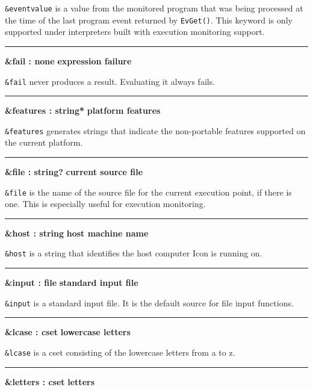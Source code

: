 \noindent
{}\texttt{\&eventvalue} is a value
from the monitored program that was being processed at the time of the
last program event returned by \texttt{EvGet()}. This keyword is only
supported under interpreters built with execution monitoring support.

\bigskip\hrule\vspace{0.1cm}
\noindent
{\bf \&fail : none } \hfill {\bf expression failure}

\noindent
{}\texttt{\&fail} never produces a
result. Evaluating it always fails.

\bigskip\hrule\vspace{0.1cm}
\noindent
{\bf \&features : string* } \hfill {\bf platform features}

\noindent
{}\texttt{\&features} generates strings that indicate the
non-portable features supported on the current platform.

\bigskip\hrule\vspace{0.1cm}
\noindent
{\bf \&file : string? } \hfill {\bf current source file}

\noindent
\texttt{\&file} is the name of the source file for
the current execution point, if there is one. This is especially useful
for execution monitoring.

\bigskip\hrule\vspace{0.1cm}
\noindent
{\bf \&host : string } \hfill {\bf host machine name}

\noindent
{}\texttt{\&host} is a string that
identifies the host computer Icon is running on.

\bigskip\hrule\vspace{0.1cm}
\noindent
{\bf \&input : file } \hfill {\bf standard input file}

\noindent
{}\texttt{\&input} is a standard input
file. It is the default source for file input functions.

\bigskip\hrule\vspace{0.1cm}
\noindent
{\bf \&lcase : cset } \hfill {\bf lowercase letters}

\noindent
{}\texttt{\&lcase} is a cset consisting of
the lowercase letters from a to z.

\bigskip\hrule\vspace{0.1cm}
\noindent
{\bf \&letters : cset } \hfill {\bf letters}

